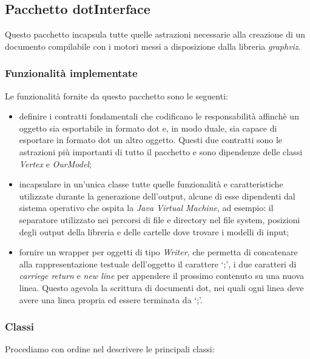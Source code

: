\subsection{Pacchetto dotInterface}
\label{subsection:dotInterface-package-description}
Questo pacchetto incapsula tutte quelle astrazioni necessarie alla
creazione di un documento compilabile con i motori messi a
disposizione dalla libreria \emph{graphviz}.

\subsubsection*{Funzionalit\`a implementate}

Le funzionalit\`a fornite da questo pacchetto sono le seguenti:
\begin{itemize}
\item definire i contratti fondamentali che codificano le
  responsabilit\`a affinch\`e un oggetto sia esportabile in formato
  dot e, in modo duale, sia capace di esportare in formato dot un
  altro oggetto. Questi due contratti sono le astrazioni pi\`u
  importanti di tutto il pacchetto e sono dipendenze delle classi
  \emph{Vertex} e \emph{OurModel};
\item incapsulare in un'unica classe tutte quelle funzionalit\`a e
  caratteristiche utilizzate durante la generazione dell'output,
  alcune di esse dipendenti dal sistema operativo che ospita la
  \emph{Java Virtual Machine}, ad esempio: il separatore utilizzato
  nei percorsi di file e directory nel file system, posizioni degli
  output della libreria e delle cartelle dove trovare i modelli di
  input;
\item fornire un wrapper per oggetti di tipo \emph{Writer}, che
  permetta di concatenare alla rappresentazione testuale dell'oggetto
  il carattere `;', i due caratteri di \emph{carriege return} e
  \emph{new line} per appendere il prossimo contenuto su una nuova
  linea. Questo agevola la scrittura di documenti dot, nei quali ogni
  linea deve avere una linea propria ed essere terminata da `;'.
\end{itemize}

\subsubsection*{Classi}
Procediamo con ordine nel descrivere le principali classi:

